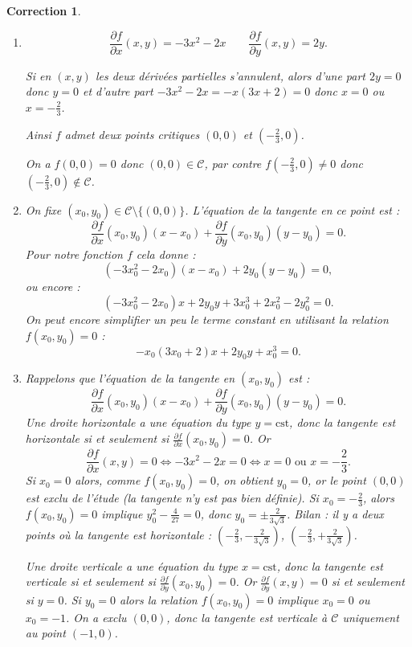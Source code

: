 \documentclass[11pt,a4paper]{article}
\theoremstyle{exostyle}
\newtheorem{cor}{Correction}
\newcommand{\correction}{\begin{cor}} \newcommand{\fincorrection}{\end{cor}}
\newcommand{\noindication}{\stepcounter{ind}}
\begin{document}
\noindication

\correction
\begin{enumerate}
	\item 
	\[
	\frac{\partial f}{\partial x}(x,y) = -3x^2 - 2x \qquad
	\frac{\partial f}{\partial y}(x,y) = 2y.
	\]
	
	Si en $(x,y)$ les deux dérivées partielles s'annulent, alors d'une part $2y=0$ donc $y=0$ et d'autre part $-3x^2 - 2x = -x(3x + 2) = 0$ donc $x=0$ ou $x=-\frac23$.
	
	Ainsi $f$ admet deux points critiques $(0,0)$ et $(-\frac23,0)$.
	
	On a $f(0,0)=0$ donc $(0,0) \in \mathcal{C}$, par contre $f (-\frac23,0) \neq 0$ donc $(-\frac23,0)  \notin \mathcal{C}$.
	
	\item On fixe $(x_0,y_0) \in \mathcal{C} \setminus \{ (0,0) \}$.
	L'équation de la tangente en ce point est :
	\[
	\frac{\partial f}{\partial x}(x_0,y_0)(x-x_0)+\frac{\partial f}{\partial y}(x_0,y_0)(y-y_0)=0.
	\]
	Pour notre fonction $f$ cela donne :
	\[
	(-3x_0^2 - 2x_0)(x - x_0) + 2y_0(y - y_0) = 0,
	\]
	ou encore :
	\[
	(-3x_0^2 - 2x_0)x + 2y_0 y +3x_0^3 + 2x_0^2-2y_0^2 = 0.
	\]
	On peut encore simplifier un peu le terme constant en utilisant la relation $f(x_0,y_0)=0$ :
	\[
	-x_0(3x_0+2)x+2y_0y+x_0^3=0.
	\]
	
	
	\item 
	Rappelons que l'équation de la tangente en $(x_0,y_0)$ est :
	\[
	\frac{\partial f}{\partial x}(x_0,y_0)(x-x_0)+\frac{\partial f}{\partial y}(x_0,y_0)(y-y_0)=0.
	\]
	Une droite horizontale a une équation du type $y=\mathrm{cst}$, donc la tangente est horizontale si et seulement si $\frac{\partial f}{\partial x}(x_0,y_0) = 0$.
	Or 
	\[
	\frac{\partial f}{\partial x}(x,y) = 0
	\iff -3x^2 - 2x = 0 
	\iff x=0 \text{ ou } x=-\frac23.
	\]
	Si $x_0=0$ alors, comme $f(x_0,y_0)=0$, on obtient $y_0=0$, or le point $(0,0)$ est exclu de l'étude (la tangente n'y est pas bien définie).
	Si $x_0=-\frac23$, alors $f(x_0,y_0)=0$ implique $y_0^2-\frac{4}{27}=0$, donc $y_0=\pm\frac{2}{3\sqrt3}$.
	Bilan : il y a deux points où la tangente est horizontale : $(-\frac23,-\frac{2}{3\sqrt3})$, $(-\frac23,+\frac{2}{3\sqrt3})$.
	
	\medskip
	
	Une droite verticale a une équation du type $x=\mathrm{cst}$, donc la tangente est verticale si et seulement si $\frac{\partial f}{\partial y}(x_0,y_0) = 0$.
	Or $\frac{\partial f}{\partial y}(x,y) = 0$ si et seulement si $y=0$.
	Si $y_0=0$ alors la relation $f(x_0,y_0)=0$ implique $x_0=0$ ou $x_0=-1$.
	On a exclu $(0,0)$, donc la tangente est verticale à $\mathcal{C}$ uniquement au point $(-1,0)$.
\end{enumerate}
\fincorrection
\end{document}
